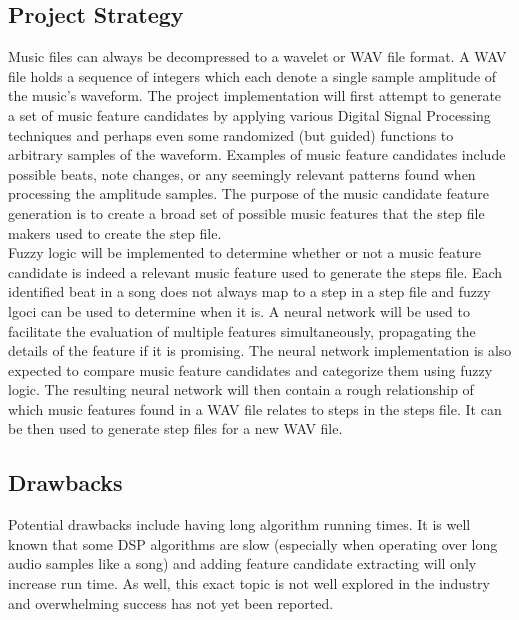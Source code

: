 \subsection{Project Strategy}
Music files can always be decompressed to a wavelet or WAV file format. A WAV file holds a sequence of
integers which each denote a single sample amplitude of the music’s waveform. The project
implementation will first attempt to generate a set of music feature candidates by applying 
various Digital Signal Processing techniques and perhaps even some randomized (but guided)
functions to arbitrary samples of the waveform. Examples of music feature candidates include
possible beats, note changes, or any seemingly relevant patterns found when processing the
amplitude samples. The purpose of the music candidate feature generation is to create a broad set
of possible music features that the step file makers used to create the step file.\\

Fuzzy logic will
be implemented to determine whether or not a music feature candidate is indeed a relevant music
feature used to generate the steps file. Each identified beat in a song does not always map to a step in a step file and fuzzy lgoci can be used to determine when it is. A neural network will be used to facilitate the evaluation
of multiple features simultaneously, propagating the details of the feature if it is promising. The
neural network implementation is also expected to compare music feature candidates and
categorize them using fuzzy logic. The resulting neural network will then contain a rough
relationship of which music features found in a WAV file relates to steps in the steps file. It can
be then used to generate step files for a new WAV file.

\subsection{Drawbacks}

Potential drawbacks include having long algorithm running times. It is well known that some
DSP algorithms are slow (especially when operating over long audio samples like a song) and
adding feature candidate extracting will only increase run time. As well, this exact topic is not
well explored in the industry and overwhelming success has not yet been reported.